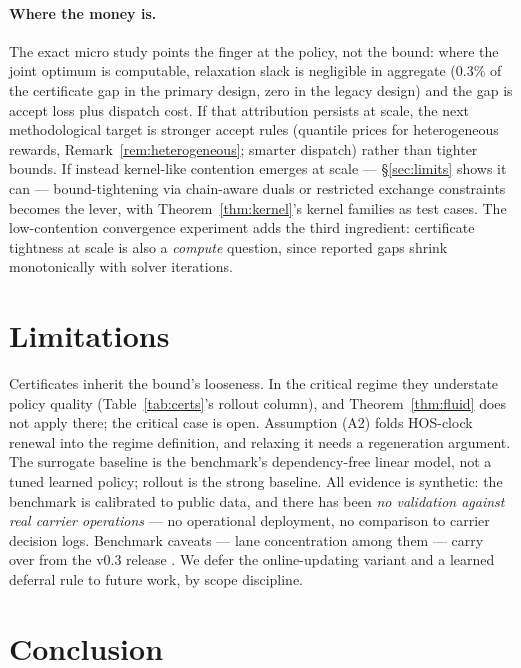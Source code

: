 \documentclass[11pt]{article}
\begin{document}
\paragraph{Where the money is.} The exact micro study points the
finger at the policy, not the bound: where the joint optimum is
computable, relaxation slack is negligible in aggregate ($0.3\%$ of
the certificate gap in the primary design, zero in the legacy design)
and the gap is accept loss plus dispatch cost. If that attribution persists at scale, the
next methodological target is stronger accept rules (quantile prices
for heterogeneous rewards, Remark~\ref{rem:heterogeneous}; smarter
dispatch) rather than tighter bounds. If instead kernel-like
contention emerges at scale --- \S\ref{sec:limits} shows it can ---
bound-tightening via chain-aware duals or restricted exchange
constraints becomes the lever, with Theorem~\ref{thm:kernel}'s kernel
families as test cases. The low-contention convergence experiment adds
the third ingredient: certificate tightness at scale is also a
\emph{compute} question, since reported gaps shrink monotonically with
solver iterations.

\section{Limitations}
\label{sec:limitations}

Certificates inherit the bound's looseness. In the critical regime they
understate policy quality (Table~\ref{tab:certs}'s rollout column), and
Theorem~\ref{thm:fluid} does not apply there; the critical case is
open. Assumption (A2) folds HOS-clock renewal into the regime
definition, and relaxing it needs a regeneration argument. The
surrogate baseline is the benchmark's dependency-free linear model, not
a tuned learned policy; rollout is the strong baseline. All evidence
is synthetic: the benchmark is calibrated to public data, and there
has been \emph{no validation against real carrier operations} ---
no operational deployment, no comparison to carrier decision logs.
Benchmark caveats --- lane concentration among them --- carry over
from the v0.3 release \citep{chandrasekaran2026freightbidbench}. We defer
the online-updating variant and a learned deferral rule to future work,
by scope discipline.

\section{Conclusion}
\label{sec:conclusion}
\end{document}
